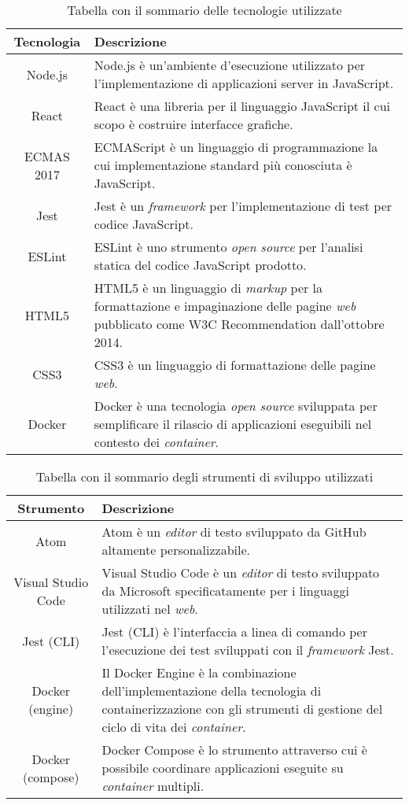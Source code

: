 \begin{table}[H]
\caption{Tabella con il sommario delle tecnologie utilizzate}
\label{tab:tecnologie}
\begin{tabularx}{\linewidth}{|c|X|}
\hline
\textbf{Tecnologia} & \textbf{Descrizione}\\
\hline
Node.js & Node.js è un'ambiente d'esecuzione utilizzato per l'implementazione di applicazioni server in JavaScript. \\
\hline
React & React è una libreria per il linguaggio JavaScript il cui scopo è costruire interfacce grafiche. \\
\hline
ECMAS 2017 & ECMAScript è un linguaggio di programmazione la cui implementazione standard più conosciuta è JavaScript. \\
\hline
Jest & Jest è un \emph{framework} per l'implementazione di test per codice JavaScript. \\
\hline
ESLint & ESLint è uno strumento \emph{open source} per l'analisi statica del codice JavaScript prodotto. \\
\hline
HTML5 & HTML5 è un linguaggio di \emph{markup} per la formattazione e impaginazione delle pagine \emph{web} pubblicato come W3C Recommendation dall'ottobre 2014. \\
\hline
CSS3 & CSS3 è un linguaggio di formattazione delle pagine \emph{web}. \\
\hline
Docker & Docker è una tecnologia \emph{open source} sviluppata per semplificare il rilascio di applicazioni eseguibili nel contesto dei \emph{container}. \\
\hline
\end{tabularx}
\end{table}

\begin{table}[H]
\caption{Tabella con il sommario degli strumenti di sviluppo utilizzati}
\label{tab:strumenti}
\begin{tabularx}{\linewidth}{|c|X|}
\hline
\textbf{Strumento} & \textbf{Descrizione}\\
\hline
Atom & Atom è un \emph{editor} di testo sviluppato da \gls{GitHub} altamente personalizzabile. \\
\hline
Visual Studio Code & Visual Studio Code è un \emph{editor} di testo sviluppato da \gls{Microsoft} specificatamente per i linguaggi utilizzati nel \emph{web}. \\
\hline
Jest (\gls{CLI}) & Jest (CLI) è l'interfaccia a linea di comando per l'esecuzione dei test sviluppati con il \emph{framework} Jest. \\
\hline
Docker (engine) & Il Docker Engine è la combinazione dell'implementazione della tecnologia di containerizzazione con gli strumenti di gestione del ciclo di vita dei \emph{container}. \\
\hline
Docker (compose) & Docker Compose è lo strumento attraverso cui è possibile coordinare applicazioni eseguite su \emph{container} multipli. \\
\hline
\end{tabularx}
\end{table}

